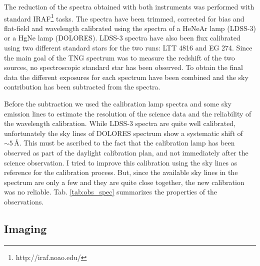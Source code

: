 \documentclass[../main.tex]{subfiles}
\begin{document}
The reduction of the spectra obtained with both instruments was performed with standard IRAF\footnote{http://iraf.noao.edu/} tasks.
The spectra have been trimmed, corrected for bias and flat-field and wavelength calibrated using the spectra of a HeNeAr lamp (LDSS-3) or a HgNe lamp (DOLORES).
LDSS-3 spectra have also been flux calibrated using two different standard stars for the two runs: LTT 4816 and EG 274.
Since the main goal of the TNG spectrum was to measure the redshift of the two sources, no spectroscopic standard star has been observed.
To obtain the final data the different exposures for each spectrum have been combined and the sky contribution has been subtracted from the spectra.

Before the subtraction we used the calibration lamp spectra and some sky emission lines to estimate the resolution of the science data and the reliability of the wavelength calibration.
While LDSS-3 spectra are quite well calibrated, unfortunately the sky lines of DOLORES spectrum show a systematic shift of $\sim 5\,\si{\angstrom}$.
This must be ascribed to the fact that the calibration lamp has been observed as part of the daylight calibration plan, and not immediately after the science observation.
I tried to improve this calibration using the sky lines as reference for the calibration process.
But, since the available sky lines in the spectrum are only a few and they are quite close together, the new calibration was no reliable.
Tab. \ref{tab:obs_spec} summarizes the properties of the observations.

\subsection{Imaging}
\label{sec:obs_ima}
\end{document}
